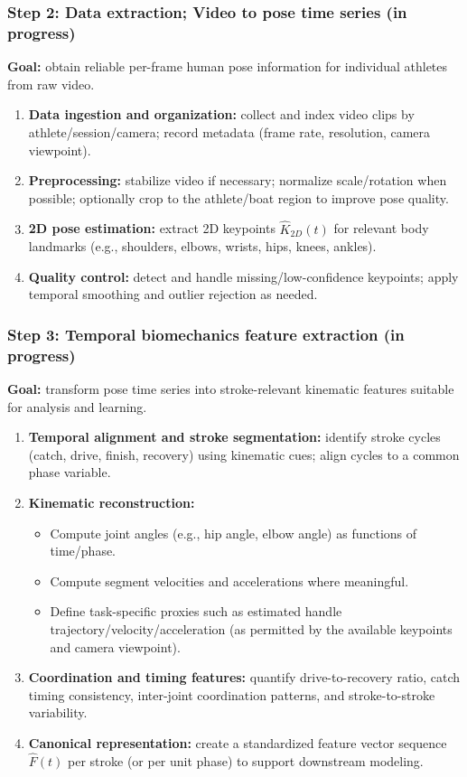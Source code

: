 \documentclass[11pt]{article}
\begin{document}
\subsubsection*{Step 2: Data extraction; Video to pose time series (in progress)}
\textbf{Goal:} obtain reliable per-frame human pose information for individual athletes from raw video.

\begin{enumerate}
  \item \textbf{Data ingestion and organization:} collect and index video clips by athlete/session/camera; record metadata (frame rate, resolution, camera viewpoint).
  \item \textbf{Preprocessing:} stabilize video if necessary; normalize scale/rotation when possible; optionally crop to the athlete/boat region to improve pose quality.
  \item \textbf{2D pose estimation:} extract 2D keypoints $\hat{K}_{2D}(t)$ for relevant body landmarks (e.g., shoulders, elbows, wrists, hips, knees, ankles).
  \item \textbf{Quality control:} detect and handle missing/low-confidence keypoints; apply temporal smoothing and outlier rejection as needed.
\end{enumerate}

\subsubsection*{Step 3: Temporal biomechanics feature extraction (in progress)}
\textbf{Goal:} transform pose time series into stroke-relevant kinematic features suitable for analysis and learning.

\begin{enumerate}
  \item \textbf{Temporal alignment and stroke segmentation:} identify stroke cycles (catch, drive, finish, recovery) using kinematic cues; align cycles to a common phase variable.
  \item \textbf{Kinematic reconstruction:}
    \begin{itemize}
      \item Compute joint angles (e.g., hip angle, elbow angle) as functions of time/phase.
      \item Compute segment velocities and accelerations where meaningful.
      \item Define task-specific proxies such as estimated handle trajectory/velocity/acceleration (as permitted by the available keypoints and camera viewpoint).
    \end{itemize}
  \item \textbf{Coordination and timing features:} quantify drive-to-recovery ratio, catch timing consistency, inter-joint coordination patterns, and stroke-to-stroke variability.
  \item \textbf{Canonical representation:} create a standardized feature vector sequence $\hat{F}(t)$ per stroke (or per unit phase) to support downstream modeling.
\end{enumerate}
\end{document}
